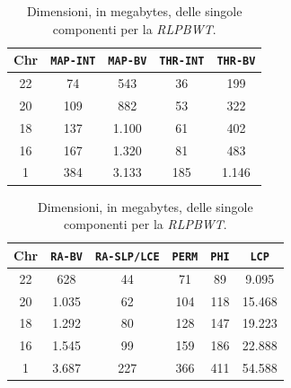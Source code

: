 \begin{table}
  \centering
  \caption{Dimensioni, in megabytes, delle singole componenti per la
    \textit{RLPBWT}.} 
  \label{tab:comp}
  \begin{tabular}{c||c|c|c|c}
    \textbf{Chr} & \textbf{\texttt{MAP-INT}} & \textbf{\texttt{MAP-BV}}
    & \textbf{\texttt{THR-INT}} & \textbf{\texttt{THR-BV}} \\
    \hline
    \hline
    22 & 74 & 543 & 36 & 199\\ \hline
    20 & 109 & 882 & 53 & 322\\ \hline
    18 & 137 & 1.100 & 61 & 402\\ \hline
    16 & 167 & 1.320 & 81 & 483\\ \hline
    1 & 384 & 3.133 & 185 & 1.146
  \end{tabular}
  \vspace{+3mm}
 \vspace{+1mm}
  \begin{tabular}{c||c|c|c|c|c}
    \textbf{Chr} & \textbf{\texttt{RA-BV}} & \textbf{\texttt{RA-SLP/LCE}}
    & \textbf{\texttt{PERM}} & \textbf{\texttt{PHI}} & \textbf{\texttt{LCP}}\\
    \hline
    \hline
    22 & 628 & 44 & 71 & 89 & 9.095\\ \hline
    20 & 1.035 & 62 & 104 & 118 & 15.468 \\ \hline
    18 & 1.292 & 80 & 128 & 147 & 19.223 \\ \hline
    16 & 1.545 & 99 & 159 & 186 & 22.888\\ \hline
    1 & 3.687 & 227 & 366 & 411 & 54.588
  \end{tabular}
\end{table}
